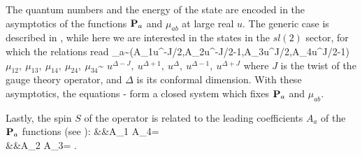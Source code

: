 	






The quantum numbers and the energy of the state are encoded in the asymptotics of the functions ${\bf P}_a$ and $\mu_{ab}$ at large real $u$. The generic case is described in \cite{PmuLong}, while here we are interested in the states in the $sl(2)$ sector, for which the relations read \cite{PmuPRL}
\beq
\bP_a\sim(A_1u^{-J/2},A_2u^{-J/2-1},A_3u^{J/2},A_4u^{J/2-1})
\label{eq:asymptotics}
\eeq
\beq
	\(\mu_{12},\ \mu_{13},\ \mu_{14},\ \mu_{24},\ \mu_{34}\)\sim
	\(u^{\Delta-J},\ u^{\Delta+1},\ u^{\Delta},\ u^{\Delta-1},\ u^{\Delta+J}\)
\label{eq:muasymptotics}
\eeq
where $J$ is the twist of the gauge theory operator, and $\Delta$ is its conformal dimension. With these asymptotics, the equations - form a closed system which fixes ${\bf P}_a$ and $\mu_{ab}$.

Lastly, the spin $S$ of the operator is related \cite{PmuPRL} to the leading coefficients $A_a$ of the ${\bf P}_a$ functions (see ):
\beqa
&&A_1 A_4= \label{AA1} \\
&&A_2 A_3= \label{AA2}\;.
\eeqa


